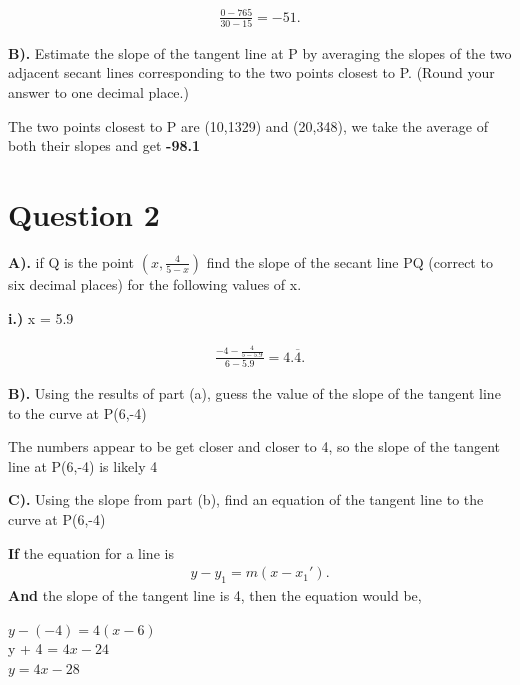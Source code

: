 \documentclass{report}
\begin{document}
    \begin{align*}
        \frac{0-765}{30-15} = -51
    .\end{align*}

    \bigbreak \noindent 
    \textbf{B).} Estimate the slope of the tangent line at P by averaging the slopes of the two adjacent secant lines corresponding to the two points closest to P. (Round your answer to one decimal place.)
    
    The two points closest to P are (10,1329) and (20,348), we take the average of both 
    their slopes and get \textbf{-98.1}
    
    \pagebreak
    \section{\Large{Question 2}}

    \bigbreak \noindent \bigbreak \noindent 

    \bigbreak \noindent 
    \textbf{A).} if Q is the point $ \left(x, \frac{4}{5-x}\right) $ 
    find the slope of the secant line PQ (correct to six decimal places) 
    for the following values of x.

    \bigbreak \noindent 
    \textbf{i.)} x = 5.9

    \begin{large}
        \begin{align*}
            \frac{-4- \frac{4}{5-5.9}}{6-5.9}
            =4.\overline{4}
        .\end{align*}
    \end{large}
    
    \bigbreak \noindent 
    \textbf{B).} Using the results of part (a), guess the value of the slope of the tangent 
    line to the curve at P(6,-4) 
    
    \bigbreak \noindent 
        The numbers appear to be get closer and closer to 4, so the slope of the tangent line
        at P(6,-4) is likely 4

    \bigbreak \noindent \bigbreak \noindent 
    \textbf{C).} Using the slope from part (b), find an equation of the tangent line 
    to the curve at P(6,-4)

    \bigbreak \noindent 
    \textbf{If} the equation for a line is
    \begin{align*}
        y-y_1=m \left(x-x_1'\right)
    .\end{align*}
    \textbf{And} the slope of the tangent line is 4, then the equation would be,
    \begin{center}
        $y- \left(-4\right) = 4 \left(x-6\right)$ \\
        y + 4 = $4x-24$ \\ 
        $y=4x-28$
    \end{center}
    
\end{document}

